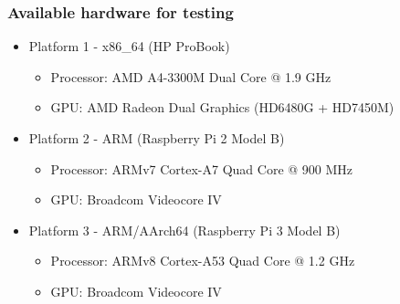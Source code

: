 \documentclass{beamer}
\begin{document}
\begin{frame}
\frametitle{Available hardware for testing}
\begin{itemize}
  \item Platform 1 - x86\_64 (HP ProBook)
  \begin{itemize}
    \item Processor: AMD A4-3300M Dual Core @ 1.9 GHz
    \item GPU: AMD Radeon Dual Graphics (HD6480G + HD7450M)
  \end{itemize}
  \item Platform 2 - ARM (Raspberry Pi 2 Model B)
  \begin{itemize}
    \item Processor: ARMv7 Cortex-A7 Quad Core @ 900 MHz
    \item GPU: Broadcom Videocore IV
  \end{itemize}
  \item Platform 3 - ARM/AArch64 (Raspberry Pi 3 Model B)
  \begin{itemize}
    \item Processor: ARMv8 Cortex-A53 Quad Core @ 1.2 GHz
    \item GPU: Broadcom Videocore IV
  \end{itemize}
\end{itemize}
\end{frame}

\end{document}
